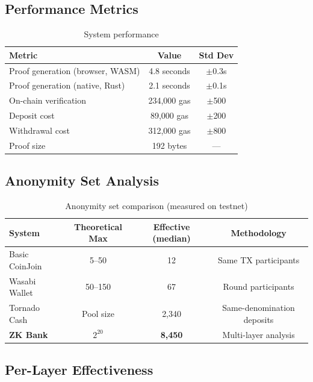\documentclass[11pt]{article}
\theoremstyle{definition}
\theoremstyle{plain}
\theoremstyle{remark}
\begin{document}
\subsection{Performance Metrics}

\begin{table}[H]
\centering
\caption{System performance}
\label{tab:performance}
\begin{tabular}{lcc}
\toprule
\textbf{Metric} & \textbf{Value} & \textbf{Std Dev} \\
\midrule
Proof generation (browser, WASM) & 4.8 seconds & $\pm$0.3s \\
Proof generation (native, Rust) & 2.1 seconds & $\pm$0.1s \\
On-chain verification & 234,000 gas & $\pm$500 \\
Deposit cost & 89,000 gas & $\pm$200 \\
Withdrawal cost & 312,000 gas & $\pm$800 \\
Proof size & 192 bytes & --- \\
\bottomrule
\end{tabular}
\end{table}

\subsection{Anonymity Set Analysis}

\begin{table}[H]
\centering
\caption{Anonymity set comparison (measured on testnet)}
\label{tab:anonymity}
\begin{tabular}{lccc}
\toprule
\textbf{System} & \textbf{Theoretical Max} & \textbf{Effective (median)} & \textbf{Methodology} \\
\midrule
Basic CoinJoin & 5--50 & 12 & Same TX participants \\
Wasabi Wallet & 50--150 & 67 & Round participants \\
Tornado Cash & Pool size & 2,340 & Same-denomination deposits \\
\textbf{ZK Bank} & $2^{20}$ & \textbf{8,450} & Multi-layer analysis \\
\bottomrule
\end{tabular}
\end{table}

\subsection{Per-Layer Effectiveness}
\end{document}
